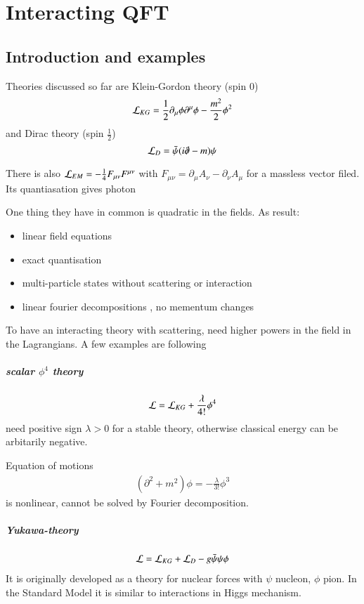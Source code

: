 \chapter{Interacting QFT}
\section{Introduction and examples}
Theories discussed so far are Klein-Gordon theory (spin $0$) $$\mathcal{L}_{KG} = \frac{1}{2}\partial_\mu\phi\partial^\mu\phi - \frac{m^2}{2}\phi^2$$ and Dirac theory (spin $\frac{1}{2}$) $$\mathcal{L}_D = \bar{\psi}(i\slashed{\partial} - m) \psi $$

There is also $\mathcal{L}_{EM} = -\frac{1}{4}F_{\mu\nu}F^{\mu\nu}$ with $F_{\mu\nu} = \partial_\mu A_\nu - \partial_\nu A_\mu$ for a massless vector filed. Its quantiasation gives photon

One thing they have in common is quadratic in the fields. As result:
\begin{itemize}
	\item linear field equations
	\item exact quantisation
	\item multi-particle states without scattering or interaction
	\item linear fourier decompositions , no mementum changes
\end{itemize}

To have an interacting theory with scattering, need higher powers in the field in the Lagrangians. A few examples are following
\paragraph{scalar $\phi^4$ theory}
\begin{align*}
	\mathcal{L} = \mathcal{L}_{KG} + \frac{\lambda}{4!} \phi^4
\end{align*}
need positive sign $\lambda > 0$ for a stable theory, otherwise classical energy can be arbitarily negative.

Equation of motions
\begin{align*}
	(\partial^2+ m ^2) \phi = -\frac{\lambda}{3!} \phi^3
\end{align*}
is nonlinear, cannot be solved by Fourier decomposition.

\paragraph{Yukawa-theory}
\begin{align*}
	\mathcal{L} = \mathcal{L}_{KG} + \mathcal{L}_{D} - g \bar{\psi}\psi \phi
\end{align*}
It is originally developed as a theory for nuclear forces with $\psi$ nucleon, $\phi$ pion. In the Standard Model it is similar to interactions in Higgs mechanism.
